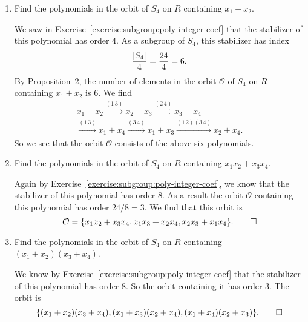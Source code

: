 \begin{enumerate}
\item Find the polynomials in the orbit of $S_4$ on $R$ containing
  $x_1 + x_2$.
  \begin{solution}
    We saw in Exercise~\ref{exercise:subgroup:poly-integer-coef} that
    the stabilizer of this polynomial has order $4$. As a subgroup of
    $S_4$, this stabilizer has index
    \begin{equation*}
      \frac{\lvert{S_4}\rvert}4 = \frac{24}4 = 6.
    \end{equation*}
    By Proposition~2, the number of elements in the orbit
    $\mathcal{O}$ of $S_4$ on $R$ containing $x_1 + x_2$ is $6$. We
    find
    \begin{multline*}
      x_1 + x_2
      \xrightarrow{(1\,3)}
      x_2 + x_3
      \xrightarrow{(2\,4)}
      x_3 + x_4 \\
      \xrightarrow{(1\,3)}
      x_1 + x_4
      \xrightarrow{(3\,4)}
      x_1 + x_3
      \xrightarrow{(1\,2)(3\,4)}
      x_2 + x_4.
    \end{multline*}
    So we see that the orbit $\mathcal{O}$ consists of the above six
    polynomials.
  \end{solution}

\item Find the polynomials in the orbit of $S_4$ on $R$ containing
  $x_1x_2 + x_3x_4$.
  \begin{solution}
    Again by Exercise~\ref{exercise:subgroup:poly-integer-coef}, we
    know that the stabilizer of this polynomial has order $8$. As a
    result the orbit $\mathcal{O}$ containing this polynomial has
    order $24/8 = 3$. We find that this orbit is
    \begin{equation*}
      \mathcal{O} =
      \{x_1x_2 + x_3x_4, x_1x_3 + x_2x_4, x_2x_3 + x_1x_4\}.
      \qedhere
    \end{equation*}
  \end{solution}

\item Find the polynomials in the orbit of $S_4$ on $R$ containing
  $(x_1 + x_2)(x_3 + x_4)$.
  \begin{solution}
    We know by Exercise~\ref{exercise:subgroup:poly-integer-coef} that
    the stabilizer of this polynomial has order $8$. So the orbit
    containing it has order $3$. The orbit is
    \begin{equation*}
      \{(x_1+x_2)(x_3+x_4), (x_1+x_3)(x_2+x_4), (x_1+x_4)(x_2+x_3)\}.
      \qedhere
    \end{equation*}
  \end{solution}
\end{enumerate}
